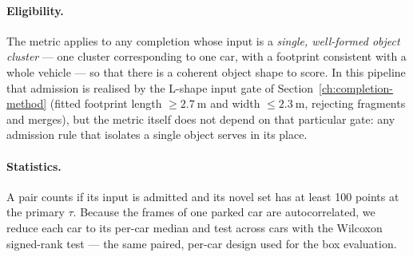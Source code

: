 \paragraph{Eligibility.} The metric applies to any completion whose input is a
\emph{single, well-formed object cluster} --- one cluster corresponding to one
car, with a footprint consistent with a whole vehicle --- so that there is a
coherent object shape to score. In this pipeline that admission is realised by the
L-shape input gate of Section~\ref{ch:completion-method} (fitted footprint length
$\geq \SI{2.7}{\meter}$ and width $\leq \SI{2.3}{\meter}$, rejecting fragments and
merges), but the metric itself does not depend on that particular gate: any
admission rule that isolates a single object serves in its place.

\paragraph{Statistics.} A pair counts if its input is admitted and its novel set
has at least \num{100} points at the primary $\tau$. Because the frames of one
parked car are autocorrelated, we reduce each car to its per-car median and test
across cars with the Wilcoxon signed-rank test --- the same paired, per-car design
used for the box evaluation.

